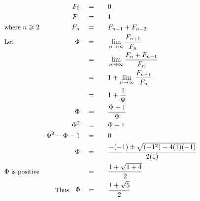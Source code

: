 \begin{alignat*}{5}
&\,&F_0\quad&=\quad&&0\\
&\,&F_1\quad&=&&1\\
&\small\text{where }n\geqslant2&F_n\quad&=&&F_{n-1}+F_{n-2}\\
&\small\text{Let }&\Phi\quad&=&&\lim_{n\to\infty}\frac{F_{n+1}}{F_n}\\
&\,&\,&=&&\lim_{n\to\infty}\frac{F_n+F_{n-1}}{F_n}\\
&\,&\,&=&&1+\lim_{n\to\infty}\frac{F_{n-1}}{F_n}\\
&\,&\,&=&&1+\frac{1}{\Phi}\\
&\,&\Phi\quad&=&&\frac{\Phi+1}{\Phi}\\
&\,&\Phi^2\quad&=&&\Phi+1\\
&\,&\Phi^2-\Phi-1\quad&=&&0\\
&\,&\Phi\quad&=&&\frac{-(-1)\pm\sqrt{(-1^2)-4(1)(-1)}}{2(1)}\\
&\Phi\small\text{ is positive}&\,&=&&\frac{1+\sqrt{1+4}}{2}\\
&\,&\small\text{Thus}\quad\Phi\quad&=&&\frac{1+\sqrt{5}}{2}
\end{alignat*}
